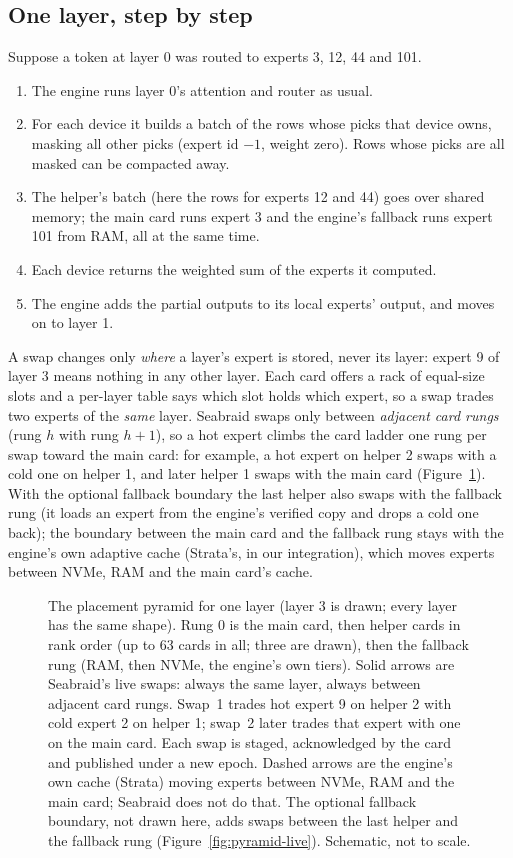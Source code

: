 \documentclass[11pt]{article}
\newcommand{\product}{Seabraid}                 %
\begin{document}
\subsection{One layer, step by step}
Suppose a token at layer 0 was routed to experts 3, 12, 44 and 101.
\begin{enumerate}
\item The engine runs layer 0's attention and router as usual.
\item For each device it builds a batch of the rows whose picks that device owns, masking all other picks
(expert id $-1$, weight zero). Rows whose picks are all masked can be compacted away.
\item The helper's batch (here the rows for experts 12 and 44) goes over shared memory; the main card runs expert 3 and the
engine's fallback runs expert 101 from RAM, all at the same time.
\item Each device returns the weighted sum of the experts it computed.
\item The engine adds the partial outputs to its local experts' output, and moves on to layer 1.
\end{enumerate}
A swap changes only \emph{where} a layer's expert is stored, never its layer: expert 9 of layer 3 means nothing in any
other layer. Each card offers a rack of equal-size slots and a per-layer table says which slot holds which expert, so
a swap trades two experts of the \emph{same} layer. \product{} swaps only between \emph{adjacent card rungs}
(rung $h$ with rung $h+1$), so a hot expert climbs the card ladder one rung per swap toward the main card: for example,
a hot expert on helper 2 swaps with a cold one on helper 1, and later helper 1 swaps with the main card
(Figure~\ref{fig:racks}). With the optional fallback boundary the last helper also swaps with the fallback rung (it loads an expert from the
engine's verified copy and drops a cold one back); the boundary between the main card and the fallback rung stays with the
engine's own adaptive cache (Strata's, in our integration), which moves experts between NVMe, RAM and the main card's cache.

\begin{figure}[t]
\centering

\caption{The placement pyramid for one layer (layer 3 is drawn; every layer has the same shape). Rung 0 is the main
card, then helper cards in rank order (up to 63 cards in all; three are drawn), then the fallback rung (RAM, then NVMe,
the engine's own tiers). Solid arrows are \product's live swaps: always the same layer, always between adjacent card
rungs. Swap~1 trades hot expert 9 on helper 2 with cold expert 2 on helper 1; swap~2 later trades that expert with
one on the main card. Each swap is staged, acknowledged by the card and published under a new epoch. Dashed arrows
are the engine's own cache (Strata) moving experts between NVMe, RAM and the main card; \product{} does not do that.
The optional fallback boundary, not drawn here, adds swaps between the last helper and the fallback rung
(Figure~\ref{fig:pyramid-live}). Schematic, not to scale.}
\label{fig:racks}
\end{figure}
\end{document}
